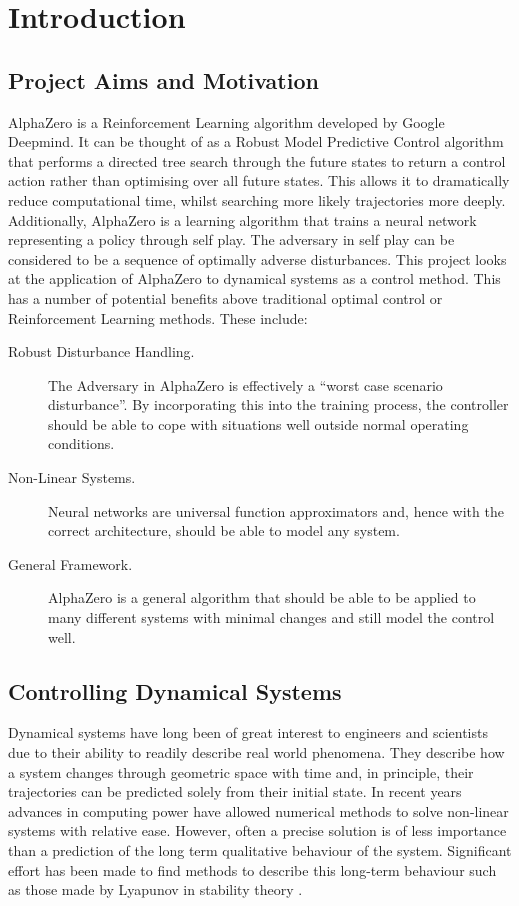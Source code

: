 \documentclass[../main.tex]{subfiles}
\begin{document}
\chapter{Introduction}

\section{Project Aims and Motivation}

AlphaZero is a Reinforcement Learning algorithm developed by Google Deepmind. It can be thought of as a Robust Model Predictive Control algorithm that performs a directed tree search through the future states to return a control action rather than optimising over all future states. This allows it to dramatically reduce computational time, whilst searching more likely trajectories more deeply. Additionally, AlphaZero is a learning algorithm that trains a neural network representing a policy through self play. The adversary in self play can be considered to be a sequence of optimally adverse disturbances. This project looks at the application of AlphaZero to dynamical systems as a control method. This has a number of potential benefits above traditional optimal control or Reinforcement Learning methods. These include:

\begin{description}
    \item[Robust Disturbance Handling.] The Adversary in AlphaZero is effectively a ``worst case scenario disturbance''. By incorporating this into the training process, the controller should be able to cope with situations well outside normal operating conditions.
    \item[Non-Linear Systems.] Neural networks are universal function approximators and, hence with the correct architecture, should be able to model any system.
    \item[General Framework.] AlphaZero is a general algorithm that should be able to be applied to many different systems with minimal changes and still model the control well. 
\end{description}


\section{Controlling Dynamical Systems}
Dynamical systems have long been of great interest to engineers and scientists due to their ability to readily describe real world phenomena. They describe how a system changes through geometric space with time and, in principle, their trajectories can be predicted solely from their initial state. In recent years advances in computing power have allowed numerical methods to solve non-linear systems with relative ease. However, often a precise solution is of less importance than a prediction of the long term qualitative behaviour of the system. Significant effort has been made to find methods to describe this long-term behaviour such as those made by Lyapunov in stability theory \cite{4f2}. 
\end{document}
